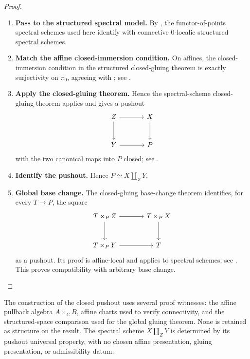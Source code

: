 \begin{proof}
\begin{enumerate}[label=\textup{(\arabic*)}]
    \item \textbf{Pass to the structured spectral model.}
    By , the functor-of-points
    spectral schemes used here identify with connective \(0\)-localic
    structured spectral schemes.

    \item \textbf{Match the affine closed-immersion condition.}
    On affines, the closed-immersion condition
    in the structured closed-gluing theorem is exactly surjectivity on
    \(\pi_0\), agreeing with
    ; see
    \cite[Theorem~4.4 and Remark~4.5]{LurieDAGIX}.

    \item \textbf{Apply the closed-gluing theorem.}
    Hence the
    spectral-scheme closed-gluing theorem applies and gives a pushout
    \[
    \begin{tikzcd}[column sep=large, row sep=large]
        Z \arrow[r] \arrow[d]
            & X \arrow[d]
        \\
        Y \arrow[r]
            & P
    \end{tikzcd}
    \]
    with the two canonical maps into \(P\) closed; see
    \cite[Theorem~6.1 and Remark~6.2]{LurieDAGIX}.

    \item \textbf{Identify the pushout.}
    Hence
    \(P\simeq X\coprod_ZY\).

    \item \textbf{Global base change.}
    The closed-gluing base-change theorem identifies, for every \(T\to P\),
    the square
    \[
    \begin{tikzcd}[column sep=large, row sep=large]
        T\times_PZ \arrow[r] \arrow[d]
            & T\times_PX \arrow[d]
        \\
        T\times_PY \arrow[r]
            & T
    \end{tikzcd}
    \]
    as a pushout. Its proof is affine-local and applies to spectral schemes;
    see \cite[Proposition~9.2]{LurieDAGIX}. This proves compatibility with
    arbitrary base change.
\end{enumerate}
\end{proof}
\begin{remark}
\label{rem:closed-gluing-no-presentation-data}
The construction of the closed pushout uses several proof witnesses: the
affine pullback algebra \(A\times_CB\), affine charts used to verify
connectivity, and the structured-space comparison used for the global gluing
theorem. None is retained as structure on the result. The spectral scheme
\(X\coprod_ZY\) is determined by its pushout universal property, with no
chosen affine presentation, gluing presentation, or admissibility datum.
\end{remark}

